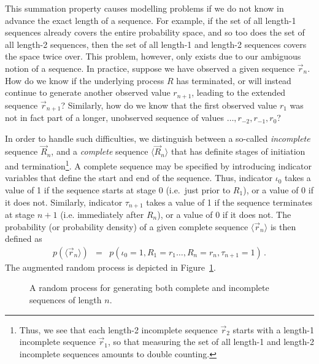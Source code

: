\documentclass[a4paper]{article}
\begin{document}
This summation property causes modelling problems if we do not know in advance the exact length of
a sequence. For example, if the set of all length-1 sequences already
covers the entire probability space, and so too does the set of all length-2 sequences,
then the set of all length-1 and length-2 sequences covers the space twice over.
This problem, however, only exists due to our ambiguous notion of a sequence.
In practice,  suppose we have observed a given sequence 
$\vec{r}_n$. How do we know if the
underlying process $R$ has terminated, or will instead
continue to generate another observed value
$r_{n+1}$, leading to the extended sequence
$\vec{r}_{n+1}$? 
Similarly, how do we know that the first observed value $r_1$ was not in fact
part of a longer, unobserved sequence of values $\ldots,r_{-2},r_{-1},r_0$?

In order to handle such difficulties, we distinguish between a so-called
{\em incomplete} sequence $\vec{R}_n$, and a {\em complete}
sequence $\langle\vec{R}_n\rangle$ that has definite stages of
initiation and termination\footnote{Thus, we see that each length-2 incomplete sequence $\vec{r}_2$ starts with a length-1 incomplete
sequence $\vec{r}_1$, so that measuring the set of all length-1 and length-2 incomplete sequences
amounts to double counting.}.
A complete sequence may be specified by introducing indicator variables
that define the start and end of the sequence.
Thus, indicator $\iota_0$ takes a value of 1 if the sequence
starts at stage 0 (i.e.\ just prior to $R_1$), 
or a value of 0 if it does not.
Similarly, indicator $\tau_{n+1}$ takes a value of 1 if the
sequence terminates at stage $n+1$ (i.e. immediately after $R_n$), or a value of 0 if it does not.
The probability (or probability density)
of a given complete sequence $\langle\vec{r}_n\rangle$ is then defined as
\begin{eqnarray}
p(\langle\vec{r}_n\rangle)
& = & p(\iota_0=1,R_1=r_1\ldots,R_n=r_n,\tau_{n+1}=1)\,.
\end{eqnarray}
The augmented random process is depicted in Figure~\ref{fig:random-process}.
\begin{figure}[hbt]
\centering
{}
\caption{A random process for generating both complete and incomplete sequences of length $n$.}
\label{fig:random-process}
\end{figure}
\end{document}
